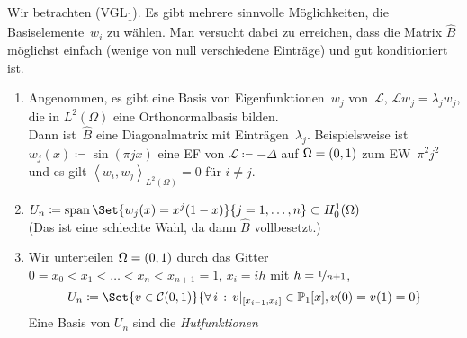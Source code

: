 \documentclass{cheat-sheet}
\newcommand{\Cont}{\mathcal{C}} %
\newcommand{\LL}{\mathcal{L}} %
\newcommand{\Laplace}{\Delta}
\newcommand{\tss}[1]{\textsubscript{#1}} %
\newcommand{\scp}[2]{\left\langle #1 , #2 \right\rangle} %
\DeclareMathOperator{\spann}{span} %
\begin{document}
\begin{bem}
  Wir betrachten (VGL\tss{1}).
  Es gibt mehrere sinnvolle Möglichkeiten, die Basiselemente~$w_i$ zu wählen.
  Man versucht dabei zu erreichen, dass die Matrix $\hat{B}$ möglichst einfach (wenige von null verschiedene Einträge) und gut konditioniert ist.
  \begin{enumerate}
    \item Angenommen, es gibt eine Basis von Eigenfunktionen~$w_j$ von~$\LL$, $\LL w_j = \lambda_j w_j$, die in $L^2(\Omega)$ eine Orthonormalbasis bilden. \\
    Dann ist~$\hat{B}$ eine Diagonalmatrix mit Einträgen~$\lambda_j$.
    Beispielsweise ist $w_j(x) \coloneqq \sin(\pi j x)$ eine EF von $\LL \coloneqq - \Laplace$ auf $\Omega = \left( 0, 1 \right)$ zum EW~$\pi^2 j^2$ und es gilt $\scp{w_i}{w_j}_{L^2(\Omega)} = 0$ für $i \neq j$.
    \item $U_n \coloneqq \spann \Set{w_j(x) = x^j (1 - x)}{j = 1, \ldots, n } \subset H_0^1(\Omega)$ \\
    (Das ist eine schlechte Wahl, da dann $\hat{B}$ vollbesetzt.)
    \item Wir unterteilen $\Omega = \left( 0, 1 \right)$ durch das Gitter
    $0 = x_0 < x_1 < \ldots < x_n < x_{n+1} = 1$,
    $x_i = i h$ mit
    $h = \nicefrac{1}{n+1}$,
    \[
      U_n \coloneqq \Set{v \in \Cont(0, 1)}{\fa{i} v|_{\cinterval{x_{i-1}}{x_i}} \in \mathbb{P}_1[x], v(0) = v(1) = 0}
    \]
    Eine Basis von $U_n$ sind die \textit{Hutfunktionen}
    \begin{center}
      \scriptsize
    \end{center}

\end{enumerate}
\end{bem}
\end{document}
